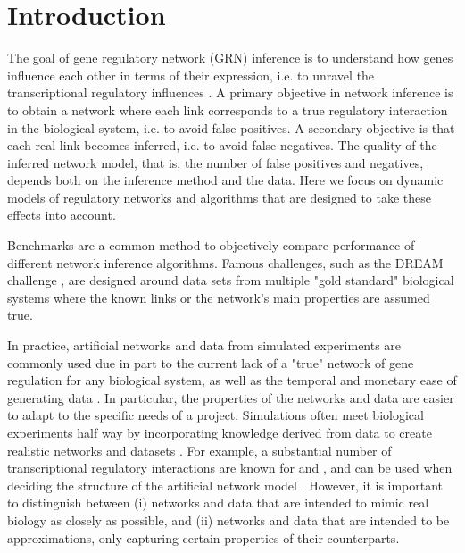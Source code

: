 \section{Introduction}

The goal of gene regulatory network (GRN) inference is to understand
how genes influence each other in terms of their expression, i.e. to
unravel the transcriptional regulatory influences \cite{Hecker2009}.
A primary objective in network inference is to obtain a network where each link corresponds to a true regulatory interaction in the biological system, i.e. to avoid false positives.
A secondary objective is that each real link becomes inferred, i.e. to avoid false negatives.
The quality of the inferred network model, that is, the number of false positives and negatives, depends both on the inference method and the data.
Here we focus on dynamic models of regulatory networks and algorithms that are designed to take these effects into account.

Benchmarks are a common method to objectively compare performance of different network inference algorithms. Famous challenges, such as the DREAM challenge \citep{Marbach2012}, are designed around data sets from multiple "gold standard" biological systems where the known links or the network's main properties are assumed true.

In practice, artificial networks and data from simulated experiments are commonly used due in part to the current lack of a "true" network of gene regulation for any biological system, as well as the temporal and monetary ease of generating data \insilico. In particular, the properties of the networks and data are easier to adapt to the specific needs of a project.
Simulations often meet biological experiments half way by incorporating knowledge derived from \invivo data to create realistic networks and \insilico datasets \citep{Bansal2007,Hache2009,Narendra2011,Penfold2011}.
For example, a substantial number of transcriptional regulatory interactions are known for \Coli and \Yeast, and can be used when deciding the structure of the artificial network model \citep{Salgado2013,Teixeira2013}.
However, it is important to distinguish between
(i) networks and data that are intended to mimic real biology as closely as possible, and
(ii) networks and data that are intended to be approximations, only capturing certain properties of their counterparts.

